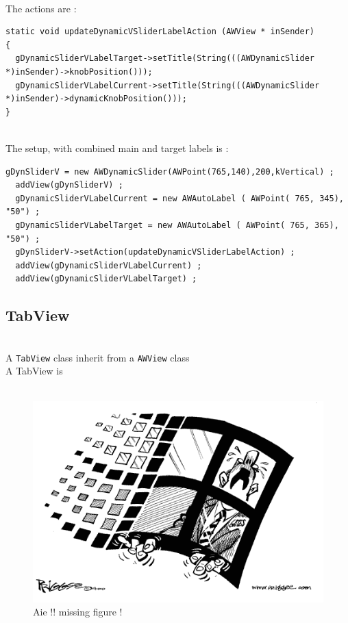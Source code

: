 \documentclass[a4paper,11pt]{extarticle}
\begin{document}
~\\ The actions are :

\begin{lstlisting}[language=Arduinonl]
static void updateDynamicVSliderLabelAction (AWView * inSender)
{
  gDynamicSliderVLabelTarget->setTitle(String(((AWDynamicSlider *)inSender)->knobPosition()));
  gDynamicSliderVLabelCurrent->setTitle(String(((AWDynamicSlider *)inSender)->dynamicKnobPosition()));
}
\end{lstlisting}

~\\ The setup, with combined main and target labels is :

\begin{lstlisting}[language=Arduinonl]
  gDynSliderV = new AWDynamicSlider(AWPoint(765,140),200,kVertical) ;
  addView(gDynSliderV) ;
  gDynamicSliderVLabelCurrent = new AWAutoLabel ( AWPoint( 765, 345), "50") ;
  gDynamicSliderVLabelTarget = new AWAutoLabel ( AWPoint( 765, 365), "50") ;
  gDynSliderV->setAction(updateDynamicVSliderLabelAction) ;
  addView(gDynamicSliderVLabelCurrent) ;
  addView(gDynamicSliderVLabelTarget) ;
\end{lstlisting}



\newpage
\subsection{TabView}

~\\ A \texttt{TabView} class inherit from a \texttt{AWView} class
~\\ A TabView is 
~\\
~\\

\begin{figure}[htbp]
   \centering
   \includegraphics[scale=0.55]{AWFig.png} 
   \caption{Aie !! missing figure !}
   \label{fig:14 }
\end{figure}
\end{document}
